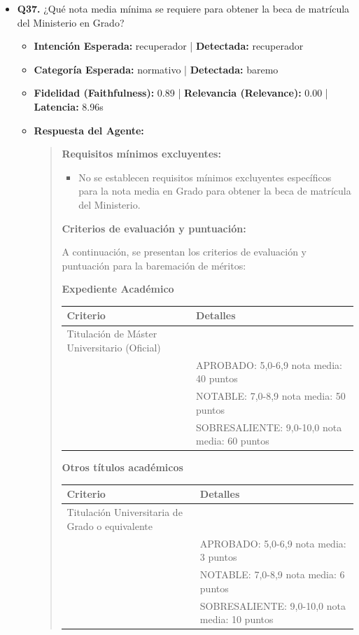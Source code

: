 \documentclass[12pt,a4paper,oneside]{report}
\begin{document}
\begin{itemize}
  
\item \textbf{Q37.} ¿Qué nota media mínima se requiere para obtener la beca de matrícula del Ministerio en Grado? \\
        \begin{itemize}
          \item \textbf{Intención Esperada:} recuperador | \textbf{Detectada:} recuperador
          \item \textbf{Categoría Esperada:} normativo | \textbf{Detectada:} baremo
          \item \textbf{Fidelidad (Faithfulness):} 0.89 | \textbf{Relevancia (Relevance):} 0.00 | \textbf{Latencia:} 8.96s
          \item \textbf{{Respuesta del Agente:}} \\
                \begin{quote}
\textbf{Requisitos mínimos excluyentes:}

\begin{itemize}
  \item No se establecen requisitos mínimos excluyentes específicos para la nota media en Grado para obtener la beca de matrícula del Ministerio.
\end{itemize}

\textbf{Criterios de evaluación y puntuación:}

A continuación, se presentan los criterios de evaluación y puntuación para la baremación de méritos:


\noindent\textbf{Expediente Académico}\\


\begin{tabular}{p{3.5cm} p{8cm}}
\toprule
\textbf{Criterio} & \textbf{Detalles} \\
\midrule
Titulación de Máster Universitario (Oficial) &  \\
 & APROBADO: 5,0-6,9 nota media: 40 puntos \\
 & NOTABLE: 7,0-8,9 nota media: 50 puntos \\
 & SOBRESALIENTE: 9,0-10,0 nota media: 60 puntos \\
\bottomrule
\end{tabular}



\noindent\textbf{Otros títulos académicos}\\


\begin{tabular}{p{3.5cm} p{8cm}}
\toprule
\textbf{Criterio} & \textbf{Detalles} \\
\midrule
Titulación Universitaria de Grado o equivalente &  \\
 & APROBADO: 5,0-6,9 nota media: 3 puntos \\
 & NOTABLE: 7,0-8,9 nota media: 6 puntos \\
 & SOBRESALIENTE: 9,0-10,0 nota media: 10 puntos \\
\bottomrule
\end{tabular}




\end{quote}
\end{itemize}
\end{itemize}
\end{document}
